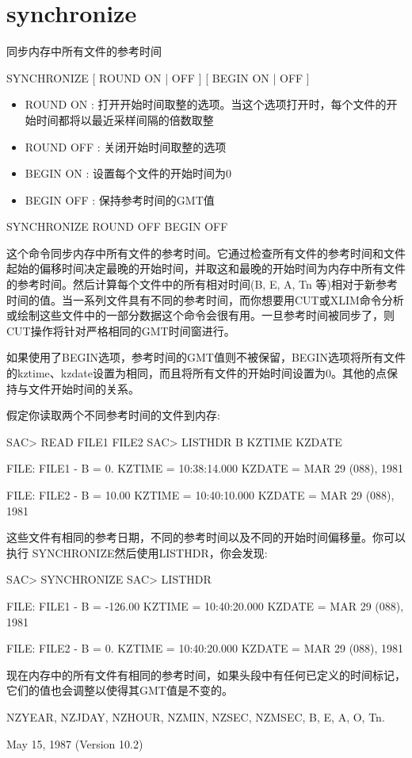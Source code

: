 \section{synchronize}
\label{cmd:synchronize}

同步内存中所有文件的参考时间

SYNCHRONIZE [ ROUND ON | OFF ] [ BEGIN ON | OFF ]

\begin{itemize}
\item ROUND ON : 打开开始时间取整的选项。当这个选项打开时，每个文件的开始时间都将以最近采样间隔的倍数取整
\item ROUND OFF : 关闭开始时间取整的选项 
\item BEGIN {ON} : 设置每个文件的开始时间为0 
\item BEGIN OFF : 保持参考时间的GMT值 
\end{itemize}

SYNCHRONIZE ROUND OFF BEGIN OFF

这个命令同步内存中所有文件的参考时间。它通过检查所有文件的参考时间和文件起始的偏移时间决定最晚的开始时间，并取这和最晚的开始时间为内存中所有文件的参考时间。然后计算每个文件中的所有相对时间(B, E, A, Tn 等)相对于新参考时间的值。当一系列文件具有不同的参考时间，而你想要用CUT或XLIM命令分析或绘制这些文件中的一部分数据这个命令会很有用。一旦参考时间被同步了，则CUT操作将针对严格相同的GMT时间窗进行。

如果使用了BEGIN选项，参考时间的GMT值则不被保留，BEGIN选项将所有文件的kztime、kzdate设置为相同，而且将所有文件的开始时间设置为0。其他的点保持与文件开始时间的关系。

假定你读取两个不同参考时间的文件到内存:
\begin{SACCode}
SAC> READ FILE1 FILE2
SAC> LISTHDR B KZTIME KZDATE

  FILE: FILE1
  -
 B = 0.
 KZTIME = 10:38:14.000
 KZDATE = MAR 29 (088), 1981

  FILE: FILE2
  -
 B = 10.00
 KZTIME = 10:40:10.000
 KZDATE = MAR 29 (088), 1981
\end{SACCode}

这些文件有相同的参考日期，不同的参考时间以及不同的开始时间偏移量。你可以执行	SYNCHRONIZE然后使用LISTHDR，你会发现:
\begin{SACCode}
SAC> SYNCHRONIZE
SAC> LISTHDR

  FILE: FILE1
  -
 B = -126.00
 KZTIME = 10:40:20.000
 KZDATE = MAR 29 (088), 1981

  FILE: FILE2
  -
 B = 0.
 KZTIME = 10:40:20.000
 KZDATE = MAR 29 (088), 1981
\end{SACCode}
现在内存中的所有文件有相同的参考时间，如果头段中有任何已定义的时间标记，它们的值也会调整以使得其GMT值是不变的。

NZYEAR, NZJDAY, NZHOUR, NZMIN, NZSEC, NZMSEC, B, E, A, O, Tn.

May 15, 1987 (Version 10.2)
